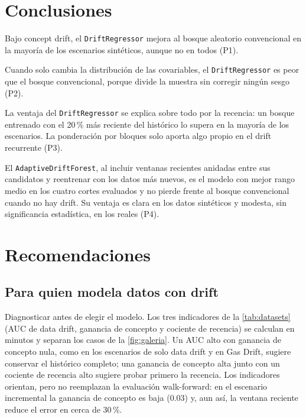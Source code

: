 \documentclass[11pt,a4paper]{article}
\begin{document}
\section{Conclusiones}\label{sec:conclusiones}

Bajo concept drift, el \texttt{DriftRegressor} mejora al bosque aleatorio convencional en la mayoría
de los escenarios sintéticos, aunque no en todos (P1).

Cuando solo cambia la distribución de las covariables, el \texttt{DriftRegressor} es peor que el
bosque convencional, porque divide la muestra sin corregir ningún sesgo (P2).

La ventaja del \texttt{DriftRegressor} se explica sobre todo por la recencia: un bosque entrenado con
el 20\,\% más reciente del histórico lo supera en la mayoría de los escenarios. La ponderación por
bloques solo aporta algo propio en el drift recurrente (P3).

El \texttt{AdaptiveDriftForest}, al incluir ventanas recientes anidadas entre sus candidatos y
reentrenar con los datos más nuevos, es el modelo con mejor rango medio en los cuatro cortes evaluados
y no pierde frente al bosque convencional cuando no hay drift. Su ventaja es clara en los datos
sintéticos y modesta, sin significancia estadística, en los reales (P4).

\section{Recomendaciones}\label{sec:recomendaciones}

\subsection{Para quien modela datos con drift}

Diagnosticar antes de elegir el modelo. Los tres indicadores de la \cref{tab:datasets} (AUC de data
drift, ganancia de concepto y cociente de recencia) se calculan en minutos y separan los casos de la
\cref{fig:galeria}. Un AUC alto con ganancia de concepto nula, como en los escenarios de solo data
drift y en Gas Drift, sugiere conservar el histórico completo; una ganancia de concepto alta junto con
un cociente de recencia alto sugiere probar primero la recencia. Los indicadores orientan, pero no
reemplazan la evaluación walk-forward: en el escenario incremental la ganancia de concepto es baja
(0.03) y, aun así, la ventana reciente reduce el error en cerca de 30\,\%.
\end{document}
